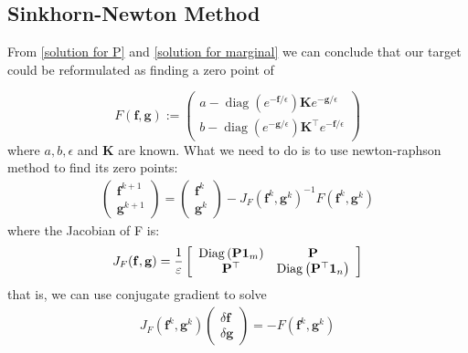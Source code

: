 \documentclass{article}
\begin{document}
\subsection{Sinkhorn-Newton Method}
From \ref{solution for P} and \ref{solution for marginal} we can conclude that our target could be reformulated as finding a zero point of

\begin{displaymath}
F(\mathbf { f },\mathbf { g}) :=
\left( \begin{array}{c}
a -  \operatorname { diag } (   e ^ { -\mathbf { f }  / \epsilon } ) \mathbf { K }  e ^ { -\mathbf { g }  / \epsilon } \\
b -  \operatorname { diag } (   e ^ { -\mathbf { g }  / \epsilon } ) \mathbf { K }^ { \top }  e ^ { -\mathbf { f }  / \epsilon }
\end{array} \right)
\end{displaymath}
where $a,b,\epsilon$ and $\mathbf { K}$ are known.
What we need to do is to use newton-raphson method to find its zero points:
\begin{align}
\left( \begin{array} { l } { \mathbf { f }^ { k + 1 } } \\ { \mathbf { g } ^ { k + 1 } } \end{array} \right) = \left( \begin{array} { l } { \mathbf { f } ^ { k } } \\ { \mathbf { g } ^ { k } } \end{array} \right) - J _ { F } \left( \mathbf { f } ^ { k } , \mathbf { g } ^ { k } \right) ^ { - 1 } F \left( \mathbf { f } ^ { k } , \mathbf { g } ^ { k } \right)
\end{align}
where the Jacobian of F is:
\begin{align}
J _ { F } ( \mathbf { f }  ,  \mathbf { g } ) = \frac { 1 } { \varepsilon } \left[ \begin{array} { c c } { \operatorname { Diag } \left( \mathbf{P} \mathbf { 1 } _ { m } \right) } & { \mathbf{P} } \\ { \mathbf{P} ^ { \top } } & { \operatorname { Diag } \left( \mathbf{P} ^ { \top } \mathbf { 1 } _ { n } \right) } \end{array} \right]
\end{align}
that is, we can use conjugate gradient to solve
\begin{align}
J _ { F } \left(  \mathbf {f} ^ { k } ,  \mathbf {g} ^ { k } \right) \left( \begin{array} { c } { \delta  \mathbf {f} } \\ { \delta  \mathbf {g} } \end{array} \right) = - F \left(  \mathbf {f} ^ { k } ,  \mathbf {g} ^ { k } \right)
\end{align}
\end{document}
